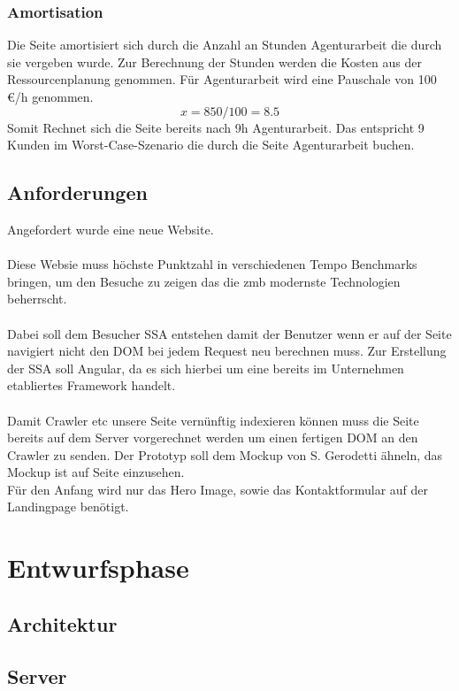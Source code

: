 \documentclass[11pt,a4paper]{article}
\begin{document}
\subsubsection{Amortisation}
Die Seite amortisiert sich durch die Anzahl an Stunden Agenturarbeit die durch sie vergeben wurde.
Zur Berechnung der Stunden werden die Kosten aus der Ressourcenplanung genommen. Für Agenturarbeit wird eine  Pauschale von 100 €/h genommen.\\
\begin{equation*}
x = 850 / 100 = 8.5
\end{equation*}
Somit Rechnet sich die Seite bereits nach 9h Agenturarbeit. Das entspricht 9 Kunden im Worst-Case-Szenario die durch die Seite Agenturarbeit buchen.
\subsection{Anforderungen}
Angefordert wurde eine neue Website.\\\\
Diese Websie muss höchste Punktzahl in verschiedenen Tempo Benchmarks bringen, um den Besuche zu zeigen das die zmb modernste Technologien beherrscht.\\\\
Dabei soll dem Besucher \acs{SSA} entstehen damit der Benutzer wenn er auf der Seite navigiert nicht den \acs{DOM} bei jedem Request neu berechnen muss. 
Zur Erstellung der SSA soll Angular, da es sich hierbei um eine bereits im Unternehmen etabliertes Framework handelt.\\\\
Damit Crawler etc unsere Seite vernünftig indexieren können muss die Seite bereits auf dem Server vorgerechnet werden um einen fertigen \acs{DOM} an den Crawler zu senden.
Der Prototyp soll dem Mockup von S. Gerodetti ähneln, das Mockup ist auf Seite \pageref{tbl:Übersicht der Zeitplanung} einzusehen.\\Für den Anfang wird nur das Hero Image, sowie das Kontaktformular auf der Landingpage benötigt. 
\section{Entwurfsphase}
\subsection{Architektur}
\subsection{Server}
\end{document}

